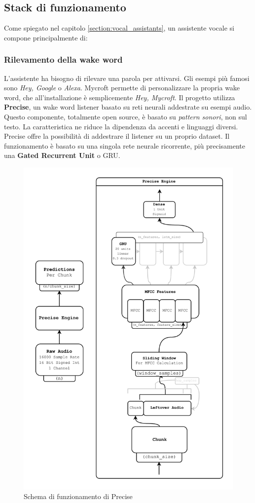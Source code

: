 \subsection{Stack di funzionamento}
Come spiegato nel capitolo \ref{section:vocal_assistants}, un assistente vocale si compone principalmente di:
\subsubsection{Rilevamento della wake word}
L'assistente ha bisogno di rilevare una parola per attivarsi. Gli esempi più famosi sono \textit{Hey, Google} o \textit{Alexa}. Mycroft permette di personalizzare la propria wake word, che all'installazione è semplicemente \textit{Hey, Mycroft}. Il progetto utilizza \textbf{Precise}, un wake word listener basato su reti neurali addestrate su esempi audio. Questo componente, totalmente open source, è basato su \textit{pattern sonori}, non sul testo. La caratteristica ne riduce la dipendenza da accenti e linguaggi diversi. Precise offre la possibilità di addestrare il listener su un proprio dataset. Il funzionamento è basato su una singola rete neurale ricorrente, più precisamente una \textbf{Gated Recurrent Unit} o GRU.
\begin{figure}[H]
    \begin{center}
        \includegraphics[width=0.6\columnwidth]{images/mycroft/precise.png}
    \end{center}
    \caption{Schema di funzionamento di Precise}
    \label{fig:precise}
\end{figure}
